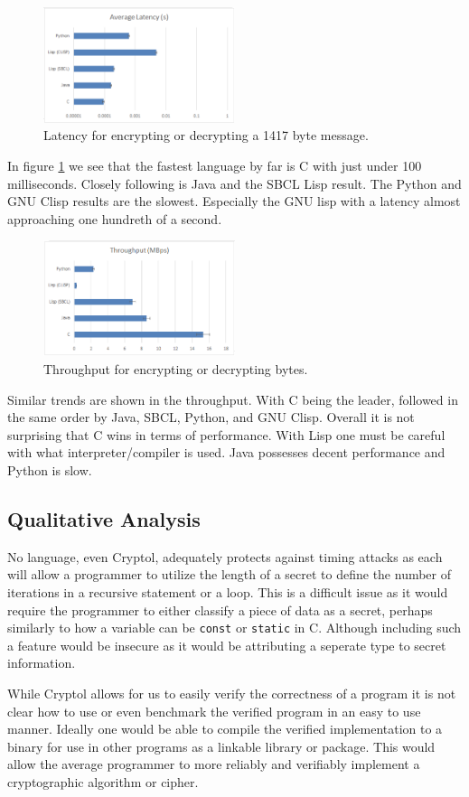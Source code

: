\begin{figure}
\centerline{ 
\includegraphics[width = 0.5\textwidth]{latency.PNG}}
\caption{Latency for encrypting or decrypting a 1417 byte message.}
\label{fig:lan}
\end{figure}

In figure \ref{fig:lan} we see that the fastest language by far is C with just under 100 milliseconds. Closely following is Java and the SBCL Lisp result. The Python and GNU Clisp results are the slowest. Especially the GNU lisp with a latency almost approaching one hundreth of a second.

\begin{figure}
\centerline{ 
\includegraphics[width = 0.5\textwidth]{throughput.PNG}}
\caption{Throughput for encrypting or decrypting bytes.}
\label{fig:ban}
\end{figure}

Similar trends are shown in the throughput. With C being the leader, followed in the same order by Java, SBCL, Python, and GNU Clisp. Overall it is not surprising that C wins in terms of performance. With Lisp one must be careful with what interpreter/compiler is used. Java possesses decent performance and Python is slow.

\subsection{Qualitative Analysis}

No language, even Cryptol, adequately protects against timing attacks as each will allow a programmer to utilize the length of a secret 
to define the number of iterations in a recursive statement or a loop. This is a difficult issue as it would require the programmer to 
either classify a piece of data as a secret, perhaps similarly to how a variable can be \texttt{const} or \texttt{static} in C. Although 
including such a feature would be insecure as it would be attributing a seperate type to secret information.

While Cryptol allows for us to easily verify the correctness of a program it is not clear how to use or even benchmark the verified program 
in an easy to use manner. Ideally one would be able to compile the verified implementation to a binary for use in other programs as a linkable 
library or package. This would allow the average programmer to more reliably and verifiably implement a cryptographic algorithm or cipher.
